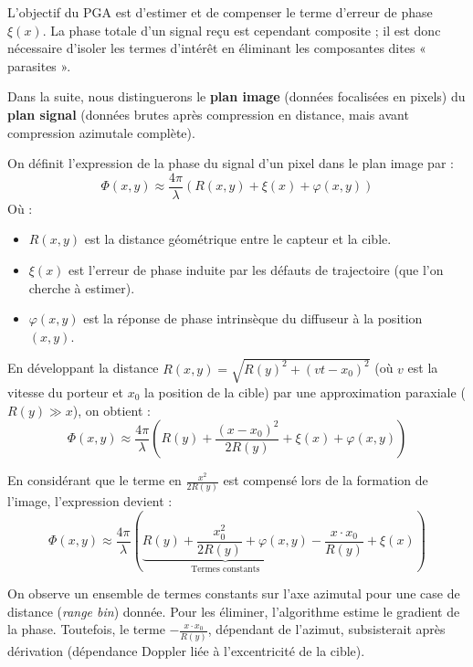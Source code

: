 L'objectif du PGA est d'estimer et de compenser le terme d'erreur de phase $\xi(x)$. La phase totale d'un signal reçu est cependant composite ; il est donc nécessaire d'isoler les termes d'intérêt en éliminant les composantes dites « parasites ». 

Dans la suite, nous distinguerons le \textbf{plan image} (données focalisées en pixels) du \textbf{plan signal} (données brutes après compression en distance, mais avant compression azimutale complète).

On définit l'expression de la phase du signal d'un pixel dans le plan image par :
\begin{equation}
\label{eq:phase}
    \Phi(x, y) \approx \frac{4 \pi}{\lambda} \left( R(x, y) + \xi(x) + \varphi(x, y) \right) 
\end{equation}
Où : 
\begin{itemize}
    \item $R(x, y)$ est la distance géométrique entre le capteur et la cible.
    \item $\xi(x)$ est l'erreur de phase induite par les défauts de trajectoire (que l'on cherche à estimer). 
    \item $\varphi(x, y)$ est la réponse de phase intrinsèque du diffuseur à la position $(x, y)$. 
\end{itemize}

En développant la distance $R(x, y) = \sqrt{R(y)^2 + (vt - x_0)^2}$ (où $v$ est la vitesse du porteur et $x_0$ la position de la cible) par une approximation paraxiale ($R(y) \gg x$), on obtient :
\begin{equation}
    \Phi(x, y) \approx \frac{4 \pi}{\lambda} \left( R(y) + \frac{(x - x_0)^2}{2R(y)} + \xi(x) + \varphi(x, y) \right)
\end{equation}

En considérant que le terme en $\frac{x^2}{2R(y)}$ est compensé lors de la formation de l'image, l'expression devient :
\begin{equation}
    \Phi(x, y) \approx \frac{4 \pi}{\lambda} \left( \underbrace{R(y) + \frac{x_0^2}{2R(y)} + \varphi(x, y)}_{\text{Termes constants}} - \frac{x \cdot x_0}{R(y)} + \xi(x) \right) 
\end{equation}

On observe un ensemble de termes constants sur l'axe azimutal pour une case de distance (\textit{range bin}) donnée. Pour les éliminer, l'algorithme estime le gradient de la phase. Toutefois, le terme $-\frac{x \cdot x_0}{R(y)}$, dépendant de l'azimut, subsisterait après dérivation (dépendance Doppler liée à l'excentricité de la cible).

